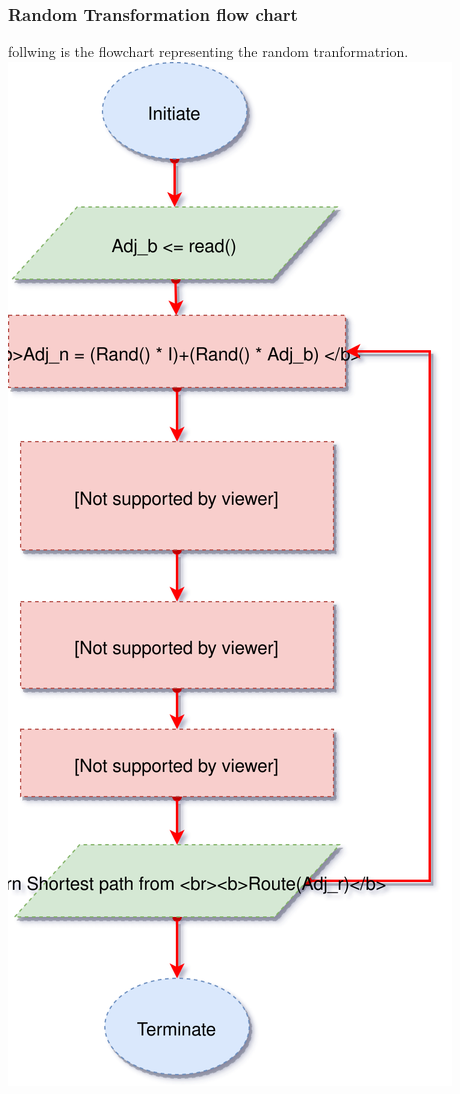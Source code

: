 \documentclass[11pt]{article}
\makeatletter
\def\maxwidth{\ifdim\Gin@nat@width>\linewidth\linewidth
    \else\Gin@nat@width\fi}
\let\Oldincludegraphics\includegraphics
\renewcommand{\includegraphics}[1]{\Oldincludegraphics[width=.8\maxwidth]{#1}}
\makeatother
\begin{document}
\subsubsection{Random Transformation flow
chart}\label{random-transformation-flow-chart}

follwing is the flowchart representing the random tranformatrion.
\includegraphics{reliable_routing_flow_chart.svg}
\end{document}
